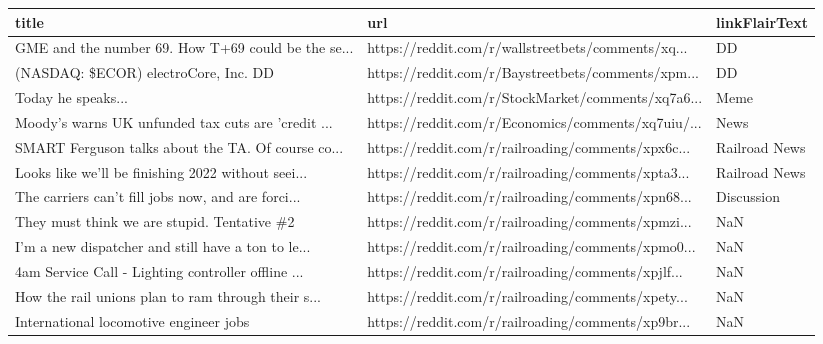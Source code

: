 \documentclass{book}
\begin{document}
  
  
  \begin{table}[htbp]%
  \centering%
  \begin{adjustbox}{width=1\textwidth}%
  \begin{tabular}{lll}
  \toprule
                                               title &                                                url & linkFlairText \\
  \midrule
  GME and the number 69. How T+69 could be the se... & https://reddit.com/r/wallstreetbets/comments/xq... &            DD \\
              (NASDAQ: \$ECOR) electroCore, Inc. {DD} & https://reddit.com/r/Baystreetbets/comments/xpm... &            DD \\
                                  Today he speaks... & https://reddit.com/r/StockMarket/comments/xq7a6... &          Meme \\
  Moody's warns UK unfunded tax cuts are 'credit ... & https://reddit.com/r/Economics/comments/xq7uiu/... &          News \\
  SMART Ferguson talks about the TA. Of course co... & https://reddit.com/r/railroading/comments/xpx6c... & Railroad News \\
  Looks like we'll be finishing 2022 without seei... & https://reddit.com/r/railroading/comments/xpta3... & Railroad News \\
  The carriers can't fill jobs now, and are forci... & https://reddit.com/r/railroading/comments/xpn68... &    Discussion \\
         They must think we are stupid. Tentative \#2 & https://reddit.com/r/railroading/comments/xpmzi... &           NaN \\
  I’m a new dispatcher and still have a ton to le... & https://reddit.com/r/railroading/comments/xpmo0... &           NaN \\
  4am Service Call - Lighting controller offline ... & https://reddit.com/r/railroading/comments/xpjlf... &           NaN \\
  How the rail unions plan to ram through their s... & https://reddit.com/r/railroading/comments/xpety... &           NaN \\
              International locomotive engineer jobs & https://reddit.com/r/railroading/comments/xp9br... &           NaN \\
  \bottomrule
  \end{tabular}
  \end{adjustbox}%
  \end{table}
  
\end{document}
